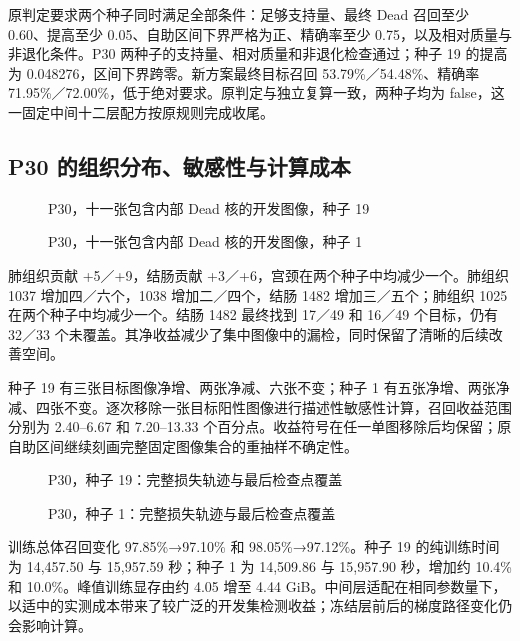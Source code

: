 \documentclass[
  11pt,
  fontset=fandol]{ctexart}
\begin{document}
原判定要求两个种子同时满足全部条件：足够支持量、最终 Dead 召回至少
0.60、提高至少 0.05、自助区间下界严格为正、精确率至少
0.75，以及相对质量与非退化条件。P30
两种子的支持量、相对质量和非退化检查通过；种子 19 的提高为
0.048276，区间下界跨零。新方案最终目标召回 53.79\%／54.48\%、精确率
71.95\%／72.00\%，低于绝对要求。原判定与独立复算一致，两种子均为
false，这一固定中间十二层配方按原规则完成收尾。

\subsection{P30
的组织分布、敏感性与计算成本}\label{p30-ux7684ux7ec4ux7ec7ux5206ux5e03ux654fux611fux6027ux4e0eux8ba1ux7b97ux6210ux672c}

\begin{figure}[H]\centering

\caption{P30，十一张包含内部 Dead 核的开发图像，种子 19}
\end{figure}

\begin{figure}[H]\centering

\caption{P30，十一张包含内部 Dead 核的开发图像，种子 1}
\end{figure}

肺组织贡献 +5／+9，结肠贡献 +3／+6，宫颈在两个种子中均减少一个。肺组织
1037 增加四／六个，1038 增加二／四个，结肠 1482 增加三／五个；肺组织
1025 在两个种子中均减少一个。结肠 1482 最终找到 17／49 和 16／49
个目标，仍有 32／33
个未覆盖。其净收益减少了集中图像中的漏检，同时保留了清晰的后续改善空间。

种子 19 有三张目标图像净增、两张净减、六张不变；种子 1
有五张净增、两张净减、四张不变。逐次移除一张目标阳性图像进行描述性敏感性计算，召回收益范围分别为
2.40--6.67 和 7.20--13.33
个百分点。收益符号在任一单图移除后均保留；原自助区间继续刻画完整固定图像集合的重抽样不确定性。

\begin{figure}[H]\centering

\caption{P30，种子 19：完整损失轨迹与最后检查点覆盖}
\end{figure}

\begin{figure}[H]\centering

\caption{P30，种子 1：完整损失轨迹与最后检查点覆盖}
\end{figure}

训练总体召回变化 97.85\%→97.10\% 和 98.05\%→97.12\%。种子 19
的纯训练时间为 14,457.50 与 15,957.59 秒；种子 1 为 14,509.86 与
15,957.90 秒，增加约 10.4\% 和 10.0\%。峰值训练显存由约 4.05 增至 4.44
GiB。中间层适配在相同参数量下，以适中的实测成本带来了较广泛的开发集检测收益；冻结层前后的梯度路径变化仍会影响计算。
\end{document}
